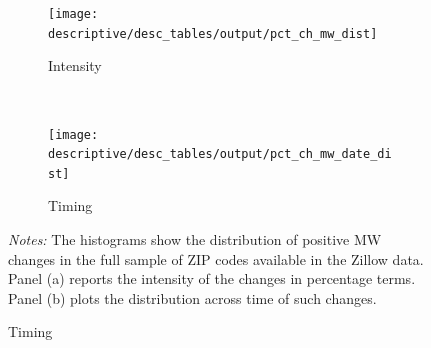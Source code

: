 \clearpage
\begin{figure}[h!]
    \centering
    \caption{Distribution of Minimum Wage Changes}
    \label{fig:d_ln_mw_dist}
    \begin{subfigure}{.7\textwidth}
        \caption{Intensity}
        \texttt{[image: descriptive/desc\_tables/output/pct\_ch\_mw\_dist]}
    \end{subfigure}\\
    \begin{subfigure}{.7\textwidth}
        \caption{Timing}
        \texttt{[image: descriptive/desc\_tables/output/pct\_ch\_mw\_date\_dist]}
    \end{subfigure}

    \begin{minipage}{.95\textwidth} \footnotesize
        \vspace{3mm}
        \textit{Notes:} The histograms show the distribution of positive MW changes 
        in the full sample of ZIP codes available in the Zillow data. Panel (a) reports 
        the intensity of the changes in percentage terms. Panel (b) plots the distribution 
        across time of such changes. 
    \end{minipage}
\end{figure}

